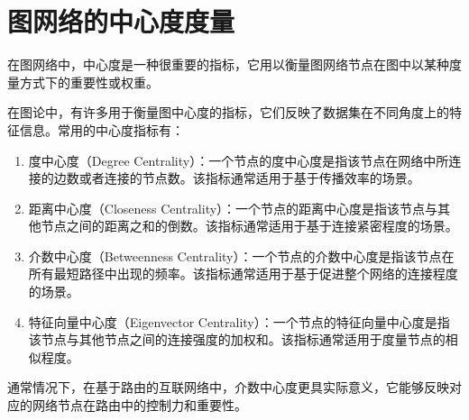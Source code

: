 \section{图网络的中心度度量}

在图网络中，中心度是一种很重要的指标，它用以衡量图网络节点在图中以某种度量方式下的重要性或权重。

在图论中，有许多用于衡量图中心度的指标，它们反映了数据集在不同角度上的特征信息。常用的中心度指标有：

\begin{enumerate}
    \item 度中心度（Degree Centrality）：一个节点的度中心度是指该节点在网络中所连接的边数或者连接的节点数。该指标通常适用于基于传播效率的场景。
    \item 距离中心度（Closeness Centrality）：一个节点的距离中心度是指该节点与其他节点之间的距离之和的倒数。该指标通常适用于基于连接紧密程度的场景。
    \item 介数中心度（Betweenness Centrality）：一个节点的介数中心度是指该节点在所有最短路径中出现的频率。该指标通常适用于基于促进整个网络的连接程度的场景。
    \item 特征向量中心度（Eigenvector Centrality）：一个节点的特征向量中心度是指该节点与其他节点之间的连接强度的加权和。该指标通常适用于度量节点的相似程度。
\end{enumerate}

通常情况下，在基于路由的互联网络中，介数中心度更具实际意义，它能够反映对应的网络节点在路由中的控制力和重要性。